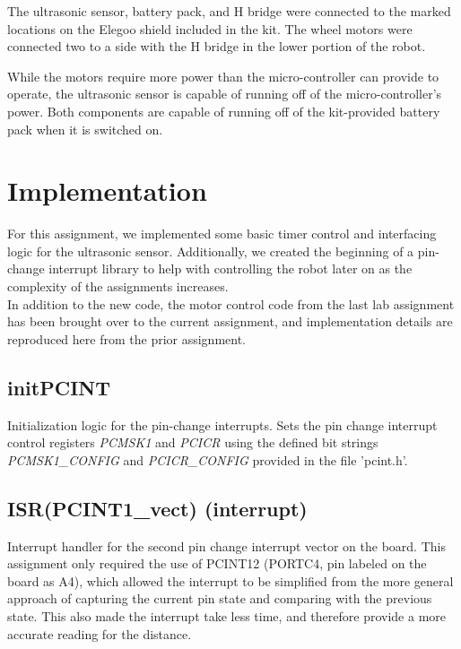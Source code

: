 \documentclass[letterpaper,11pt]{texMemo} %
\begin{document}
The ultrasonic sensor, battery pack, and H bridge were connected to the marked locations on the Elegoo shield included in the kit. The wheel motors were connected two to a side with the H bridge in the lower portion of the robot.

While the motors require more power than the micro-controller can provide to operate, the ultrasonic sensor is capable of running off of the micro-controller's power. Both components are capable of running off of the kit-provided battery pack when it is switched on.



\section*{Implementation}
For this assignment, we implemented some basic timer control and interfacing logic for the ultrasonic sensor. Additionally, we created the beginning of a pin-change interrupt library to help with controlling the robot later on as the complexity of the assignments increases.\\

In addition to the new code, the motor control code from the last lab assignment has been brought over to the current assignment, and implementation details are reproduced here from the prior assignment.

\subsection*{initPCINT}
Initialization logic for the pin-change interrupts. Sets the pin change interrupt control registers \textit{PCMSK1} and \textit{PCICR} using the defined bit strings \textit{PCMSK1\_CONFIG} and \textit{PCICR\_CONFIG} provided in the file 'pcint.h'.

\subsection*{ISR(PCINT1\_vect) (interrupt)}
Interrupt handler for the second pin change interrupt vector on the board. This assignment only required the use of PCINT12 (PORTC4, pin labeled on the board as A4), which allowed the interrupt to be simplified from the more general approach of capturing the current pin state and comparing with the previous state. This also made the interrupt take less time, and therefore provide a more accurate reading for the distance.
\end{document}
